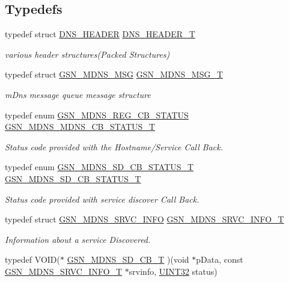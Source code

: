 \subsection*{Typedefs}
\begin{DoxyCompactItemize}
\item 
typedef struct \hyperlink{a00013}{DNS\_\-HEADER} \hyperlink{a00668_gaf26129a48ef3757ef5060ba8bb457d9c}{DNS\_\-HEADER\_\-T}
\begin{DoxyCompactList}\small\item\em various header structures(Packed Structures) \end{DoxyCompactList}\item 
typedef struct \hyperlink{a00145}{GSN\_\-MDNS\_\-MSG} \hyperlink{a00668_ga3216bbc2adc29e835ce14e76c1e80d44}{GSN\_\-MDNS\_\-MSG\_\-T}
\begin{DoxyCompactList}\small\item\em mDns message queue message structure \end{DoxyCompactList}\item 
typedef enum \hyperlink{a00668_ga4736a957266d4e3ba37c9d5ec86beec8}{GSN\_\-MDNS\_\-REG\_\-CB\_\-STATUS} \hyperlink{a00668_gab2cd71424a7a8f16216fe22eb24e31b3}{GSN\_\-MDNS\_\-MDNS\_\-CB\_\-STATUS\_\-T}
\begin{DoxyCompactList}\small\item\em Status code provided with the Hostname/Service Call Back. \end{DoxyCompactList}\item 
typedef enum \hyperlink{a00668_gaf68e291caa4e1bdf31169e000c41750b}{GSN\_\-MDNS\_\-SD\_\-CB\_\-STATUS\_\-T} \hyperlink{a00668_ga81d8695cbcffd3e0d102ef17d1981938}{GSN\_\-MDNS\_\-SD\_\-CB\_\-STATUS\_\-T}
\begin{DoxyCompactList}\small\item\em Status code provided with service discover Call Back. \end{DoxyCompactList}\item 
typedef struct \hyperlink{a00146}{GSN\_\-MDNS\_\-SRVC\_\-INFO} \hyperlink{a00668_gaab0d47b6c1928b684129f17c0fbd1292}{GSN\_\-MDNS\_\-SRVC\_\-INFO\_\-T}
\begin{DoxyCompactList}\small\item\em Information about a service Discovered. \end{DoxyCompactList}\item 
typedef VOID($\ast$ \hyperlink{a00668_gaef8391be45a1399b7895289b3b56d632}{GSN\_\-MDNS\_\-SD\_\-CB\_\-T} )(void $\ast$pData, const \hyperlink{a00146}{GSN\_\-MDNS\_\-SRVC\_\-INFO\_\-T} $\ast$srvinfo, \hyperlink{a00660_gae1e6edbbc26d6fbc71a90190d0266018}{UINT32} status)

\end{DoxyCompactItemize}
